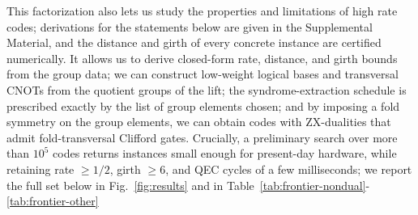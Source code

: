\documentclass[amsmath,amssymb,twocolumn,aps,prl,superscriptaddress,nofootinbib]{revtex4-2}
\theoremstyle{definition}
\begin{document}
This factorization also lets us study the properties and limitations of high rate codes; derivations for the statements below are given in the Supplemental Material, and the distance and girth of every concrete instance are certified numerically. It allows us to derive closed-form rate, distance, and girth bounds from the group data; we can construct low-weight logical bases and transversal CNOTs from the quotient groups of the lift; the syndrome-extraction schedule is prescribed exactly by the list of group elements chosen; and by imposing a fold symmetry on the group elements, we can obtain codes with ZX-dualities that admit fold-transversal Clifford gates. Crucially, a preliminary search over more than $10^5$ codes returns instances small enough for present-day hardware, while retaining rate $\ge1/2$, girth $\ge6$, and QEC cycles of a few milliseconds; we report the full set below in Fig.~\ref{fig:results} and in Table~\ref{tab:frontier-nondual}-\ref{tab:frontier-other}
\end{document}
